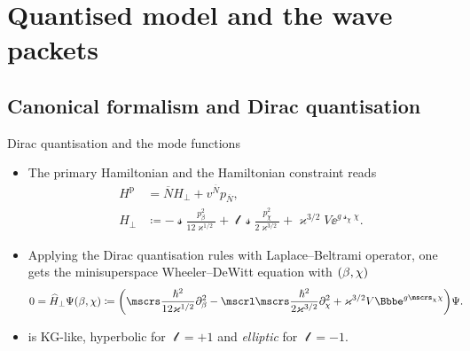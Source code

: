 \documentclass[9pt]{beamer}
\begin{document}
\section{Quantised model and the wave packets}

\subsection{Canonical formalism and Dirac quantisation}

\begin{frame}%
{Dirac quantisation and the mode functions}%
\begin{itemize}
\item
The primary Hamiltonian and the Hamiltonian
constraint reads
\begin{align}
H^\text{p} &= \overline{N}H_\perp + v^{\overline{N}} p_{\overline{N}},
\\
H_\perp &\coloneqq -\mscrs\frac{p_\beta^2}{12\varkappa^{1/2}}
+\mscrl\mscrs\frac{p_\chi^2}{2\varkappa^{3/2}}
+\varkappa^{3/2}V\ee^{g\mscrs_\chi\chi}.
\end{align}
\item
Applying the Dirac quantisation rules with Laplace--Beltrami
operator, one 
gets the minisuperspace Wheeler--DeWitt equation with ${\left(\beta,\chi\right)}$
\begin{align}
0 &= \widehat{H}_\perp \rfun{\Psi}{\beta,\chi} \coloneqq
\rbr{\mscrs\frac{\hslash^2}{12\varkappa^{1/2}}\partial_{\beta}^2
-\mscrl\mscrs\frac{\hslash^2}{2\varkappa^{3/2}}\partial_{\chi}^2
+\varkappa^{3/2}V\ee^{g\mscrs_\chi\chi}}\Psi.
\label{eq:WDW-10}
\end{align}
\item
{} is KG-like, hyperbolic for $\mscrl = +1$ and 
\emph{elliptic} for $\mscrl = -1$.
\end{itemize}
\end{frame}
\end{document}
